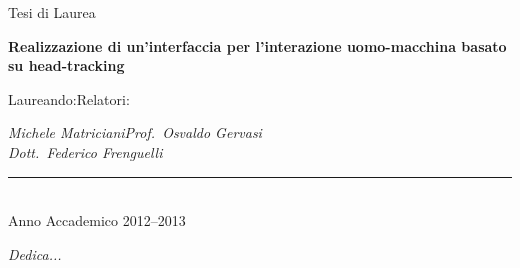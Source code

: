 \documentclass[a4paper,12pt]{report}
\def\titolotesi{Realizzazione di un'interfaccia per l'interazione uomo-macchina basato su head-tracking} %
\def\laureando{Michele Matriciani}       %
\def\annoaccademico{2012--2013}    %
\def\dedica{Dedica...}      %
\begin{document}
\begin{titlepage}
\begin{center}
\vspace*{-2.5cm}

\Large Tesi di Laurea \par\bigskip


\vspace*{0.3cm}

{\large \bf \titolotesi \par}

\bigskip\bigskip\bigskip

\end{center}\par

\hspace{0.05cm}Laureando:\hspace{7.3cm}Relatori:\par

\hspace{0.0cm}\emph{\laureando}\hfill\emph{Prof.~Osvaldo Gervasi}\\
\hspace{7.8cm}\hfill\emph{Dott.~Federico Frenguelli}

\vfill

\begin{center}

\rule{40mm}{0.01mm}\\

Anno Accademico \annoaccademico

\end{center}

\end{titlepage}
\newpage
\vspace*{2.5cm}
\begin{flushright}
\begin{Large}\emph{\dedica}\end{Large}
\end{flushright}
\frenchspacing


%



\tableofcontents



\end{document}
